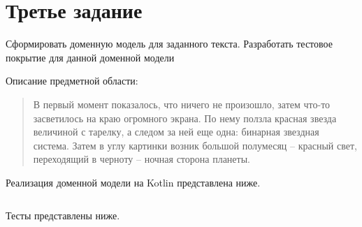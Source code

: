 \section{Третье задание}
Сформировать доменную модель для заданного текста.  Разработать тестовое покрытие для данной доменной модели

Описание предметной области:
\begin{quote}
В первый момент показалось, что ничего не произошло, затем что-то засветилось на краю огромного экрана. По нему ползла красная звезда величиной с тарелку, а следом за ней еще одна: бинарная звездная система. Затем в углу картинки возник большой полумесяц -- красный свет, переходящий в черноту -- ночная сторона планеты.
\end{quote}

Реализация доменной модели на Kotlin представлена ниже.
\inputminted[breaklines]{kotlin}{task3/src/main/kotlin/Main.kt}

Тесты представлены ниже.
\inputminted[breaklines]{kotlin}{task3/src/test/kotlin/MainTest.kt}
